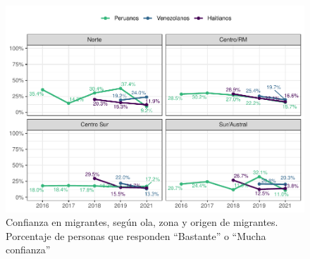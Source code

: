 \documentclass[
  12pt,
]{book}
\begin{document}
\begin{figure}

{\centering \includegraphics{reporte-elsoc_files/figure-latex/conf-zona-1} 

}

\caption{Confianza en migrantes, según ola, zona y origen de migrantes. Porcentaje de personas que responden “Bastante” o “Mucha confianza”}\label{fig:conf-zona}
\end{figure}
\end{document}
